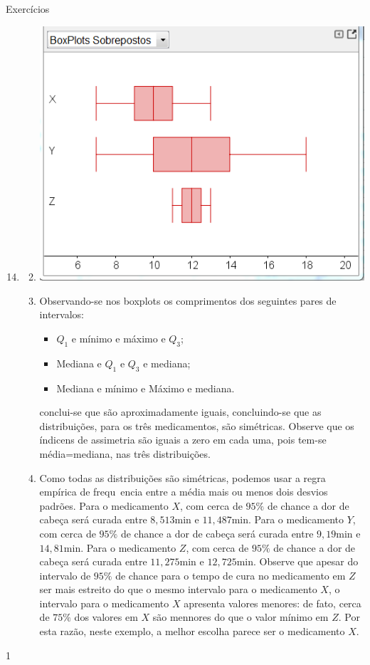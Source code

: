 \begin{answer}{Exercícios}
{\exerciselist
  \begin{enumerate}\setcounter{enumi}{13}
  \item 
  \begin{enumerate}\setcounter{enumii}{1}
  \item {}
  {
  \includegraphics[width=.8\linewidth]{boxplotsmedicamentos.png}
  }
  \item Observando-se nos boxplots os comprimentos dos seguintes pares de intervalos:
  \begin{itemize}
  \item $Q_1$ e mínimo e máximo e $Q_3$;
  \item Mediana e $Q_1$ e $Q_3$ e mediana;
  \item Mediana e mínimo e Máximo e mediana.
  \end{itemize}
  conclui-se que são aproximadamente iguais, concluindo-se que as distribuições, para os três medicamentos, são simétricas. Observe que os índicens de assimetria são iguais a zero em cada uma, pois tem-se média=mediana, nas três distribuições.
  \item Como todas as distribuições são simétricas, podemos usar a regra empírica de frequ~encia entre a média mais ou menos dois desvios padrões. Para o medicamento $X$, com cerca de $95\%$ de chance a dor de cabeça será curada entre $8{,}513$min e $11{,}487$min. Para o medicamento $Y$, com cerca de $95\%$ de chance a dor de cabeça será curada entre $9{,}19$min e $14{,}81$min. Para o medicamento $Z$, com cerca de $95\%$ de chance a dor de cabeça será curada entre $11{,}275$min e $12{,}725$min. Observe que apesar do intervalo de $95\%$ de chance para o tempo de cura no medicamento em $Z$ ser mais estreito do que o mesmo intervalo para o medicamento $X$, o intervalo para o medicamento $X$ apresenta valores menores: de fato, cerca de $75\%$ dos valores em $X$ são mennores do que o valor mínimo em $Z$. Por esta razão, neste exemplo, a melhor escolha parece ser o medicamento $X$.
  \end{enumerate}
  \end{enumerate}
}{1}
\end{answer}

